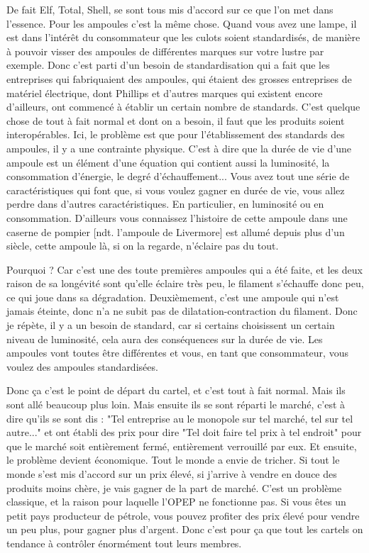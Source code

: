 \begin{small}
De fait Elf, Total, Shell, se sont tous mis d'accord sur ce que l'on met dans l'essence. Pour les ampoules c'est la même chose. Quand vous avez une lampe, il est dans l'intérêt du consommateur que les culots soient standardisés, de manière à pouvoir visser des ampoules de différentes marques sur votre lustre par exemple.
Donc c'est parti d'un besoin de standardisation qui a fait que les entreprises qui fabriquaient des ampoules, qui étaient des grosses entreprises de matériel électrique, dont Phillips et d'autres marques qui existent encore d'ailleurs, ont commencé à établir un certain nombre de standards.
C'est quelque chose de tout à fait normal et dont on a besoin, il faut que les produits soient interopérables.
Ici, le problème est que pour l'établissement des standards des ampoules, il y a une contrainte physique.
C'est à dire que la durée de vie d'une ampoule est un élément d'une équation qui contient aussi la luminosité, la consommation d'énergie, le degré d'échauffement...
Vous avez tout une série de caractéristiques qui font que, si vous voulez gagner en durée de vie, vous allez perdre dans d'autres caractéristiques. En particulier, en luminosité ou en consommation. D'ailleurs vous connaissez l'histoire de cette ampoule dans une caserne de pompier [ndt. l'ampoule de Livermore] est allumé depuis plus d'un siècle, cette ampoule là, si on la regarde, n'éclaire pas du tout.

Pourquoi ? Car c'est une des toute premières ampoules qui a été faite, et les deux raison de sa longévité sont qu'elle éclaire très peu, le filament s'échauffe donc peu, ce qui joue dans sa dégradation. Deuxièmement, c'est une ampoule qui n'est jamais éteinte, donc n'a ne subit pas de dilatation-contraction du filament.
Donc je répète, il y a un besoin de standard, car si certains choisissent un certain niveau de luminosité, cela aura des conséquences sur la durée de vie.
Les ampoules vont toutes être différentes et vous, en tant que consommateur, vous voulez des ampoules standardisées.

Donc ça c'est le point de départ du cartel, et c'est tout à fait normal. Mais ils sont allé beaucoup plus loin.
Mais ensuite ils se sont réparti le marché, c'est à dire qu'ils se sont dis : "Tel entreprise au le monopole sur tel marché, tel sur tel autre..." et ont établi des prix pour dire "Tel doit faire tel prix à tel endroit" pour que le marché soit entièrement fermé, entièrement verrouillé par eux. Et ensuite, le problème devient économique. Tout le monde a envie de tricher. Si tout le monde s'est mis d'accord sur un prix élevé, si j'arrive à vendre en douce des produits moins chère, je vais gagner de la part de marché. C'est un problème classique, et la raison pour laquelle l'OPEP ne fonctionne pas. Si vous êtes un petit pays producteur de pétrole, vous pouvez profiter des prix élevé pour vendre un peu plus, pour gagner plus d'argent. Donc c'est pour ça que tout les cartels on tendance à contrôler énormément tout leurs membres.


\end{small}
